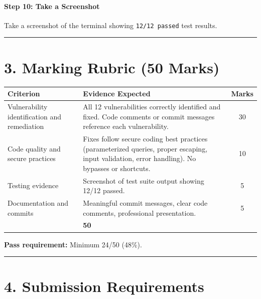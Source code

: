 \documentclass[12pt,a4paper]{article}
\begin{document}
\paragraph{Step 10: Take a Screenshot}
Take a screenshot of the terminal showing \texttt{12/12 passed} test results.

\vspace{0.5cm}
\hrule
\vspace{0.5cm}

\section*{3. Marking Rubric (50 Marks)}

\vspace{0.3cm}
\begin{tabularx}{\textwidth}{|p{6cm}|X|c|}
\hline
\rowcolor{iumred!15}
\textbf{Criterion} & \textbf{Evidence Expected} & \textbf{Marks} \\
\hline
Vulnerability identification and remediation & All 12 vulnerabilities correctly identified and fixed. Code comments or commit messages reference each vulnerability. & 30 \\
\hline
Code quality and secure practices & Fixes follow secure coding best practices (parameterized queries, proper escaping, input validation, error handling). No bypasses or shortcuts. & 10 \\
\hline
Testing evidence & Screenshot of test suite output showing 12/12 passed. & 5 \\
\hline
Documentation and commits & Meaningful commit messages, clear code comments, professional presentation. & 5 \\
\hline
\rowcolor{iumred!15}
\multicolumn{2}{|l|}{\textbf{Total}} & \textbf{50} \\
\hline
\end{tabularx}

\vspace{0.3cm}
\textbf{Pass requirement:} Minimum 24/50 (48\%).

\vspace{0.5cm}
\hrule
\vspace{0.5cm}

\section*{4. Submission Requirements}
\end{document}
